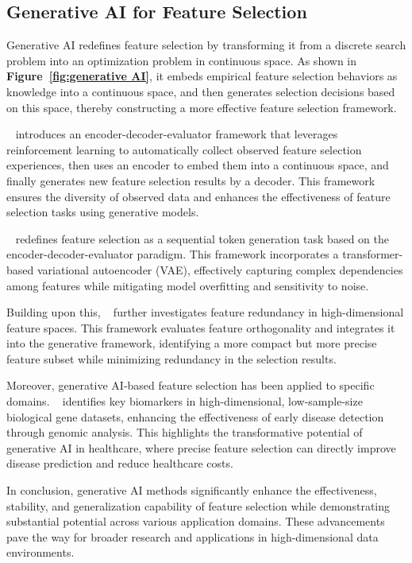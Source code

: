 \subsection{Generative AI for Feature Selection} 
Generative AI redefines feature selection by transforming it from a discrete search problem into an optimization problem in continuous space. As shown in \textbf{Figure~\ref{fig:generative AI}}, it embeds empirical feature selection behaviors as knowledge into a continuous space, and then generates selection decisions based on this space, thereby constructing a more effective feature selection framework.

~\cite{GAINS} introduces an encoder-decoder-evaluator framework that leverages reinforcement learning to automatically collect observed feature selection experiences, then uses an encoder to embed them into a continuous space, and finally generates new feature selection results by a decoder. This framework ensures the diversity of observed data and enhances the effectiveness of feature selection tasks using generative models.

~\cite{VTFS} redefines feature selection as a sequential token generation task based on the encoder-decoder-evaluator paradigm. This framework incorporates a transformer-based variational autoencoder (VAE), effectively capturing complex dependencies among features while mitigating model overfitting and sensitivity to noise.

Building upon this, ~\cite{FNFS} further investigates feature redundancy in high-dimensional feature spaces. This framework evaluates feature orthogonality and integrates it into the generative framework, identifying a more compact but more precise feature subset while minimizing redundancy in the selection results.

Moreover, generative AI-based feature selection has been applied to specific domains. ~\cite{GERBIL} identifies key biomarkers in high-dimensional, low-sample-size biological gene datasets, enhancing the effectiveness of early disease detection through genomic analysis. This highlights the transformative potential of generative AI in healthcare, where precise feature selection can directly improve disease prediction and reduce healthcare costs.

In conclusion, generative AI methods significantly enhance the effectiveness, stability, and generalization capability of feature selection while demonstrating substantial potential across various application domains. These advancements pave the way for broader research and applications in high-dimensional data environments.






